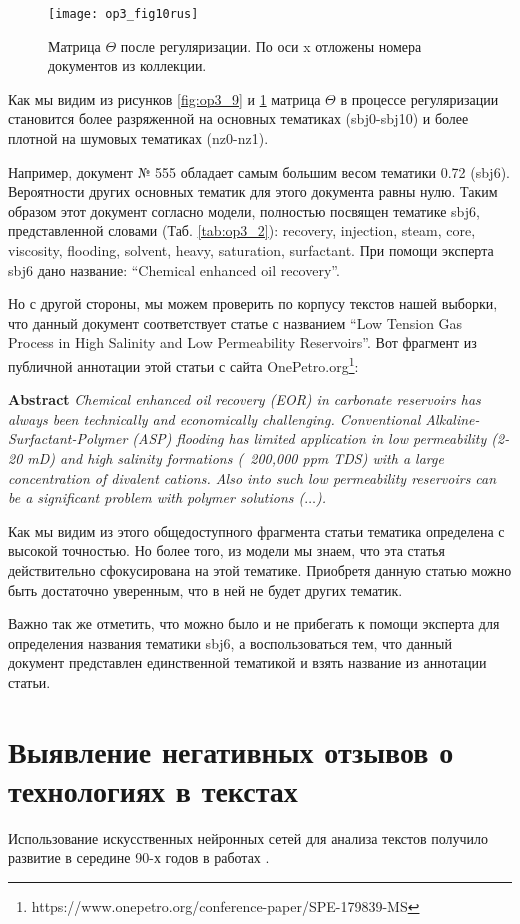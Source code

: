 \begin{figure}[H]
  \caption{Матрица $ \Theta $ после регуляризации. По оси x отложены номера документов из коллекции.}
  \centering
    \texttt{[image: op3\_fig10rus]}
  \label{fig:op3_10}
\end{figure}

Как мы видим из рисунков \ref{fig:op3_9} и \ref{fig:op3_10}  матрица $\Theta$ в процессе
регуляризации становится более разряженной на основных тематиках
(sbj0-sbj10) и более плотной на шумовых тематиках (nz0-nz1).

Например, документ № 555 обладает самым большим весом тематики 0.72
(sbj6). Вероятности других основных тематик для этого документа равны
нулю. Таким образом этот документ согласно модели, полностью посвящен
тематике sbj6, представленной словами
(Таб. \ref{tab:op3_2}): recovery, injection, steam,
core, viscosity, flooding, solvent, heavy, saturation, surfactant. При
помощи эксперта sbj6 дано название: ``Chemical enhanced oil recovery''.

Но с другой стороны, мы можем проверить по корпусу текстов нашей
выборки, что данный документ соответствует статье с названием ``Low
Tension Gas Process in High Salinity and Low Permeability Reservoirs''.
Вот фрагмент из публичной аннотации этой статьи с сайта
OnePetro.org\footnote{\textsuperscript{}
  https://www.onepetro.org/conference-paper/SPE-179839-MS}:


\textbf{Abstract}
\textit{Chemical enhanced oil recovery (EOR) in carbonate reservoirs has always been technically and economically challenging. Conventional Alkaline-Surfactant-Polymer (ASP) flooding has limited application in low permeability (2-20 mD) and high salinity formations (~200,000 ppm TDS) with a large concentration of divalent cations. Also  into such low permeability reservoirs can be a significant problem with polymer solutions ($\dots$).}

Как мы видим из этого общедоступного фрагмента статьи тематика
определена с высокой точностью. Но более того, из модели мы знаем, что
эта статья действительно сфокусирована на этой тематике. Приобретя
данную статью можно быть достаточно уверенным, что в ней не будет других
тематик.

Важно так же отметить, что можно было и не прибегать к помощи эксперта
для определения названия тематики sbj6, а воспользоваться тем, что
данный документ представлен единственной тематикой и взять название из аннотации статьи.

\section[Глубокий анализ текстов публикаций]{Выявление негативных отзывов о технологиях в текстах}
\label{seq:emo}
Использование искусственных нейронных сетей для анализа текстов получило развитие в середине 90-х годов в работах \cite{ng1997feature,lam1999feature,lam1999automatic}. 

